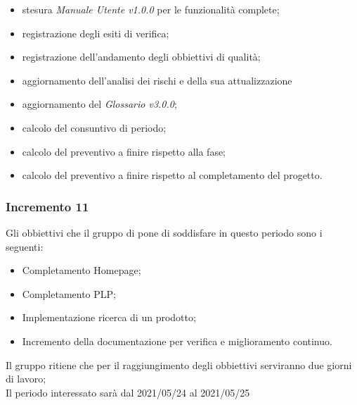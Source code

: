 \begin{itemize}
\begin{itemize}
              \item stesura \textit{Manuale Utente v1.0.0} per le funzionalità complete;
              \item registrazione degli esiti di verifica;
              \item registrazione dell'andamento degli obbiettivi di qualità;
              \item aggiornamento dell'analisi dei rischi e della sua attualizzazione
              \item aggiornamento del \textit{Glossario v3.0.0};
              \item calcolo del consuntivo di periodo;
              \item calcolo del preventivo a finire rispetto alla fase;
              \item calcolo del preventivo a finire rispetto al completamento del progetto.
          \end{itemize}
\end{itemize}

\subsubsection{Incremento 11}
Gli obbiettivi che il gruppo di pone di soddisfare in questo periodo sono i seguenti:
\begin{itemize}
    \item Completamento Homepage;
    \item Completamento PLP;
    \item Implementazione ricerca di un prodotto;
    \item Incremento della documentazione per verifica e miglioramento continuo.
\end{itemize}
Il gruppo ritiene che per il raggiungimento degli obbiettivi serviranno due giorni di lavoro;\\
Il periodo interessato sarà dal 2021/05/24 al 2021/05/25


